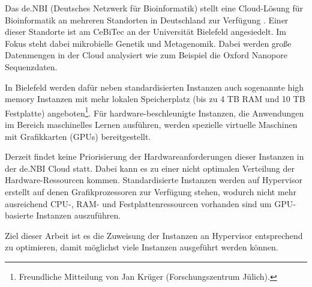 \documentclass[../Main.tex]{subfiles}
\begin{document}
Das de.NBI (Deutsches Netzwerk für Bioinformatik) stellt eine Cloud-Lösung für Bioinformatik an mehreren Standorten in Deutschland zur Verfügung \citep{deNBI}.
Einer dieser Standorte ist am CeBiTec an der Universität Bielefeld angesiedelt.
Im Fokus steht dabei mikrobielle Genetik und Metagenomik. Dabei werden gro{\ss}e Datenmengen
in der Cloud analysiert wie zum Beispiel die Oxford Nanopore Sequenzdaten.

In Bielefeld werden dafür neben standardisierten Instanzen auch sogenannte \glqq high memory\grqq{} Instanzen mit mehr
lokalen Speicherplatz (bis zu 4 TB RAM und 10 TB Festplatte) angeboten\footnote{Freundliche Mitteilung von Jan Krüger (Forschungszentrum Jülich).}. Für hardware-beschleunigte
Instanzen, die Anwendungen im Bereich maschinelles Lernen ausführen, werden spezielle virtuelle Maschinen
mit Grafikkarten (GPUs) bereitgestellt.

Derzeit findet keine Priorisierung der Hardwareanforderungen dieser Instanzen in der de.NBI Cloud statt. Dabei kann es zu einer nicht optimalen
Verteilung der Hardware-Ressourcen kommen. Standardisierte Instanzen werden
auf Hypervisor erstellt auf denen Grafikprozessoren zur Verfügung stehen, wodurch nicht mehr ausreichend CPU-, RAM- und Festplattenressourcen
vorhanden sind um GPU-basierte Instanzen auszuführen.

Ziel dieser Arbeit ist es die Zuweisung der Instanzen an Hypervisor entsprechend zu optimieren, damit möglichst viele Instanzen
ausgeführt werden können.

\biblio %
\end{document}
